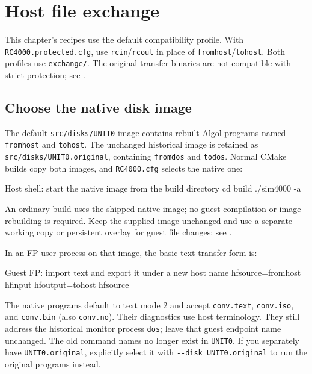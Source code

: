 \chapter{Host file exchange}\label{host-file-exchange}

This chapter's recipes use the default compatibility profile. With
\texttt{RC4000.protected.cfg}, use \texttt{rcin}/\texttt{rcout} in place of
\texttt{fromhost}/\texttt{tohost}. Both profiles use \texttt{exchange/}.
The original transfer binaries are not compatible with
strict protection; see
.

\section{Choose the native disk image}\label{choose-the-native-disk-image}

The default \passthrough{\lstinline!src/disks/UNIT0!} image contains rebuilt Algol programs named \passthrough{\lstinline!fromhost!} and \passthrough{\lstinline!tohost!}. The unchanged historical image is retained as \passthrough{\lstinline!src/disks/UNIT0.original!}, containing \passthrough{\lstinline!fromdos!} and \passthrough{\lstinline!todos!}. Normal CMake builds copy both images, and \passthrough{\lstinline!RC4000.cfg!} selects the native one:

\begin{commandexample}[language=sh]{Host shell: start the native image from the build directory}
cd build
./sim4000 -a
\end{commandexample}

An ordinary build uses the shipped native image; no guest compilation or image rebuilding is required. Keep the supplied image unchanged and use a separate working copy or persistent overlay for guest file changes; see .

In an FP user process on that image, the basic text-transfer form is:

\begin{commandexample}{Guest FP: import text and export it under a new host name}
hfsource=fromhost hfinput
hfoutput=tohost hfsource
\end{commandexample}

The native programs default to text mode 2 and accept \passthrough{\lstinline!conv.text!}, \passthrough{\lstinline!conv.iso!}, and \passthrough{\lstinline!conv.bin!} (also \passthrough{\lstinline!conv.no!}). Their diagnostics use host terminology. They still address the historical monitor process \passthrough{\lstinline!dos!}; leave that guest endpoint name unchanged. The old command names no longer exist in \passthrough{\lstinline!UNIT0!}. If you separately have \passthrough{\lstinline!UNIT0.original!}, explicitly select it with \passthrough{\lstinline!--disk UNIT0.original!} to run the original programs instead.

